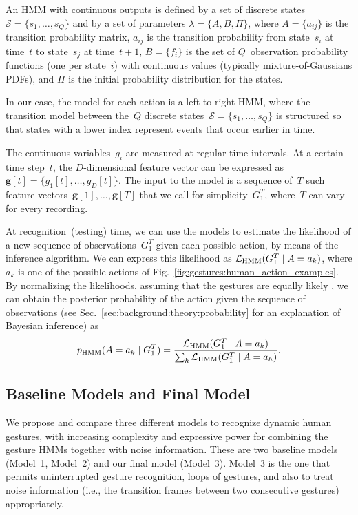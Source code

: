 An \ac{HMM} with continuous outputs is defined by a set of discrete states~$\mathcal{S} = \{s_1, \dots, s_Q\}$ and by a set of parameters $\lambda = \{ A, B, \Pi \}$, where $A = \{ a_{ij} \}$ is the transition probability matrix, $a_{ij}$ is the transition probability from state~$s_i$ at time~$t$ to state~$s_j$ at time~$t+1$, $B = \{ f_i \}$ is the set of $Q$~observation probability functions (one per state~$i$) with continuous values (typically mixture-of-Gaussians \aclp{PDF}), and $\Pi$ is the initial probability distribution for the states.

In our case, the model for each action is a left-to-right \ac{HMM}, where the transition model between the~$Q$ discrete states~$\mathcal{S} = \{s_1, \dots, s_Q\}$ is structured so that states with a lower index represent events that occur earlier in time.

The continuous variables~$g_i$ are measured at regular time intervals.
At a certain time step~$t$, the $D$-dimensional feature vector can be expressed as~$\bm{g}[t] = \{g_1[t], \dots, g_D[t]\}$.
The input to the model is a sequence of~$T$ such feature vectors~$\bm{g}[1], \dots, \bm{g}[T]$ that we call for simplicity~$G_1^T$, where~$T$ can vary for every recording.

At recognition~(testing) time, we can use the models to estimate the likelihood of a new sequence of observations~$G_1^T$ given each possible action, by means of the \FB{} inference algorithm.
We can express this likelihood as $\mathcal{L}_\text{HMM}(G_1^T \mid A=a_k)$, where $a_k$ is one of the possible actions of Fig.~\ref{fig:gestures:human_action_examples}.
By normalizing the likelihoods, assuming that the gestures are equally likely \apriori, we can obtain the posterior probability of the action given the sequence of observations (see Sec.~\ref{sec:background:theory:probability} for an explanation of Bayesian inference) as
\begin{equation} \label{eq:phmm_action}
  p_{\text{HMM}}(A=a_k \mid G_1^T) = \frac{\mathcal{L}_\text{HMM}(G_1^T \mid A=a_k)}{\sum_h \mathcal{L}_\text{HMM}(G_1^T \mid A=a_h)}.
\end{equation}

\subsection{Baseline Models and Final Model}
\label{sec:gesture_recognition:approach:gesture_model:models}

We propose and compare three different models to recognize dynamic human gestures, with increasing complexity and expressive power for combining the gesture \acp{HMM} together with noise information.
These are two baseline models (Model~1, Model~2) and our final model (Model~3).
Model~3 is the one that permits uninterrupted gesture recognition, loops of gestures, and also to treat noise information (i.e., the transition frames between two consecutive gestures) appropriately.

